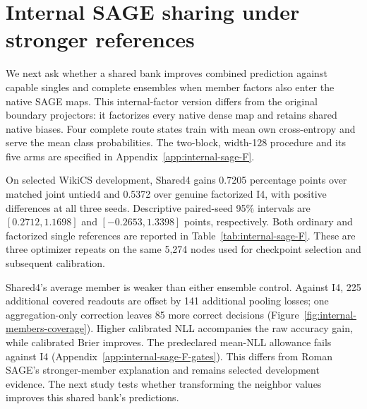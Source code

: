 \section{Internal SAGE sharing under stronger references}\label{sec:internal-sage}
We next ask whether a shared bank improves combined prediction against capable singles and complete ensembles when member factors also enter the native SAGE maps. This internal-factor version differs from the original boundary projectors: it factorizes every native dense map and retains shared native biases. Four complete route states train with mean own cross-entropy and serve the mean class probabilities. The two-block, width-128 procedure and its five arms are specified in Appendix~\ref{app:internal-sage-F}.

On selected WikiCS development, Shared4 gains 0.7205 percentage points over matched joint untied4 and 0.5372 over genuine factorized I4, with positive differences at all three seeds. Descriptive paired-seed 95\% intervals are $[0.2712,1.1698]$ and $[-0.2653,1.3398]$ points, respectively. Both ordinary and factorized single references are reported in Table~\ref{tab:internal-sage-F}. These are three optimizer repeats on the same 5,274 nodes used for checkpoint selection and subsequent calibration.

Shared4's average member is weaker than either ensemble control. Against I4, 225 additional covered readouts are offset by 141 additional pooling losses; one aggregation-only correction leaves 85 more correct decisions (Figure~\ref{fig:internal-members-coverage}). Higher calibrated NLL accompanies the raw accuracy gain, while calibrated Brier improves. The predeclared mean-NLL allowance fails against I4 (Appendix~\ref{app:internal-sage-F-gates}). This differs from Roman SAGE's stronger-member explanation and remains selected development evidence. The next study tests whether transforming the neighbor values improves this shared bank's predictions.
